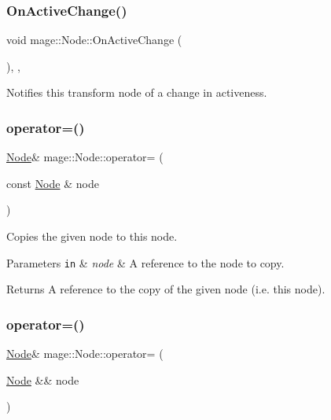 \subsubsection{\texorpdfstring{On\+Active\+Change()}{OnActiveChange()}}
{\footnotesize\ttfamily void mage\+::\+Node\+::\+On\+Active\+Change (\begin{DoxyParamCaption}{ }\end{DoxyParamCaption})\hspace{0.3cm}{\ttfamily [private]}, {\ttfamily [virtual]}, {\ttfamily [noexcept]}}

Notifies this transform node of a change in activeness. \hypertarget{classmage_1_1_node_ad10ea13608963acfa06d3c1577314da5}{}\label{classmage_1_1_node_ad10ea13608963acfa06d3c1577314da5} 
\subsubsection{\texorpdfstring{operator=()}{operator=()}\hspace{0.1cm}{\footnotesize\ttfamily [1/2]}}
{\footnotesize\ttfamily \hyperlink{classmage_1_1_node}{Node}\& mage\+::\+Node\+::operator= (\begin{DoxyParamCaption}\item[{const \hyperlink{classmage_1_1_node}{Node} \&}]{node }\end{DoxyParamCaption})\hspace{0.3cm}{\ttfamily [delete]}}

Copies the given node to this node.


\begin{DoxyParams}[1]{Parameters}
\mbox{\tt in}  & {\em node} & A reference to the node to copy. \\
\hline
\end{DoxyParams}
\begin{DoxyReturn}{Returns}
A reference to the copy of the given node (i.\+e. this node). 
\end{DoxyReturn}
\hypertarget{classmage_1_1_node_a007043de35c65edb9a0d790824186151}{}\label{classmage_1_1_node_a007043de35c65edb9a0d790824186151} 
\subsubsection{\texorpdfstring{operator=()}{operator=()}\hspace{0.1cm}{\footnotesize\ttfamily [2/2]}}
{\footnotesize\ttfamily \hyperlink{classmage_1_1_node}{Node}\& mage\+::\+Node\+::operator= (\begin{DoxyParamCaption}\item[{\hyperlink{classmage_1_1_node}{Node} \&\&}]{node }\end{DoxyParamCaption})\hspace{0.3cm}{\ttfamily [delete]}}


